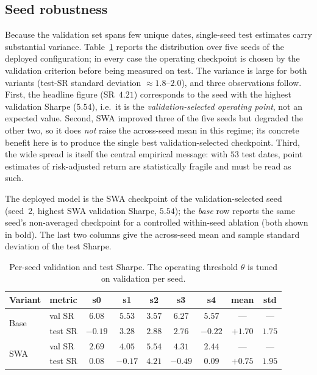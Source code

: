 \documentclass[runningheads]{llncs}
\begin{document}
\subsection{Seed robustness}
\label{sec:seed}
Because the validation set spans few unique dates, single-seed test estimates
carry substantial variance. Table~\ref{tab:seed} reports the distribution over
five seeds of the deployed configuration; in every case the operating
checkpoint is chosen by the validation criterion before being measured on test.
The variance is large for both variants (test-SR standard deviation $\approx
1.8$--$2.0$), and three observations follow. First, the headline figure
(SR~$4.21$) corresponds to the seed with the highest validation Sharpe ($5.54$),
i.e.\ it is the \emph{validation-selected operating point}, not an expected
value. Second, SWA improved three of the five seeds but degraded the other two,
so it does \emph{not} raise the across-seed mean in this regime; its concrete
benefit here is to produce the single best validation-selected checkpoint.
Third, the wide spread is itself the central empirical message: with $53$ test
dates, point estimates of risk-adjusted return are statistically fragile and
must be read as such.

The deployed model is the SWA checkpoint of the validation-selected seed
(seed~2, highest SWA validation Sharpe, $5.54$); the \emph{base} row reports the
same seed's non-averaged checkpoint for a controlled within-seed ablation (both
shown in bold). The last two columns give the across-seed mean and sample
standard deviation of the test Sharpe.

\begin{table}[t]
\centering
\caption{Per-seed validation and test Sharpe. The operating threshold
$\theta$ is tuned on validation per seed.}
\label{tab:seed}
\setlength{\tabcolsep}{4.5pt}
\begin{tabular}{llccccccc}
\toprule
Variant & metric & s0 & s1 & s2 & s3 & s4 & mean & std \\
\midrule
\multirow{2}{*}{Base}
 & val SR  & $6.08$ & $5.53$ & $\mathbf{3.57}$ & $6.27$ & $5.57$ & --- & --- \\
 & test SR & $-0.19$ & $3.28$ & $\mathbf{2.88}$ & $2.76$ & $-0.22$ & $+1.70$ & $1.75$ \\
\midrule
\multirow{2}{*}{SWA}
 & val SR  & $2.69$ & $4.05$ & $\mathbf{5.54}$ & $4.31$ & $2.44$ & --- & --- \\
 & test SR & $0.08$ & $-0.17$ & $\mathbf{4.21}$ & $-0.49$ & $0.09$ & $+0.75$ & $1.95$ \\
\bottomrule
\end{tabular}
\end{table}
\end{document}
